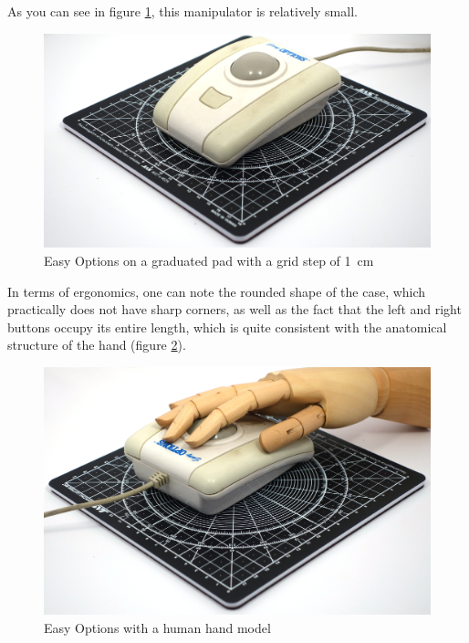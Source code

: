 \documentclass[11pt, a4paper]{article}
\begin{document}
As you can see in figure \ref{fig:EasyOptionsSize}, this manipulator is relatively small.

\begin{figure}[h]
    \centering
    \includegraphics[scale=0.43]{1993_easy_options_trackball/size_30.jpg}
    \caption{Easy Options on a graduated pad with a grid step of 1~cm}
    \label{fig:EasyOptionsSize}
\end{figure}

In terms of ergonomics, one can note the rounded shape of the case, which practically does not have sharp corners, as well as the fact that the left and right buttons occupy its entire length, which is quite consistent with the anatomical structure of the hand (figure \ref{fig:EasyOptionsHand}).

\begin{figure}[h]
    \centering
    \includegraphics[scale=0.43]{1993_easy_options_trackball/hand_30.jpg}
    \caption{Easy Options with a human hand model}
    \label{fig:EasyOptionsHand}
\end{figure}
\end{document}
